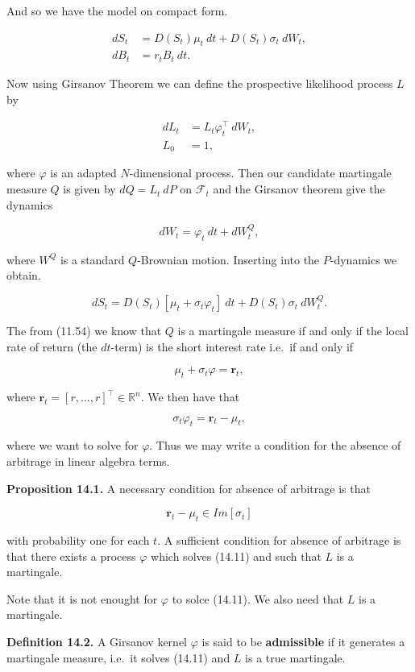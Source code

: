 \documentclass[
]{article}
\begin{document}
And so we have the model on compact form.

\begin{align*}
dS_t&= D(S_t)\mu_t\ dt+D(S_t)\sigma_t\ dW_t,\\
dB_t&=r_tB_t\ dt.
\end{align*}

Now using Girsanov Theorem we can define the prospective likelihood
process \(L\) by

\begin{align*}
dL_t&=L_t\varphi_t^\top\ dW_t,\\
L_0&=1,
\end{align*}

where \(\varphi\) is an adapted \(N\)-dimensional process. Then our
candidate martingale measure \(Q\) is given by \(dQ=L_t\ dP\) on
\(\mathcal{F}_t\) and the Girsanov theorem give the dynamics

\[
dW_t=\varphi_t\ dt+dW_t^Q,
\]

where \(W^Q\) is a standard \(Q\)-Brownian motion. Inserting into the
\(P\)-dynamics we obtain.

\[
dS_t=D(S_t)[\mu_t+\sigma_t\varphi_t]\ dt+D(S_t)\sigma_t\ dW_t^Q.
\]

The from (11.54) we know that \(Q\) is a martingale measure if and only
if the local rate of return (the \(dt\)-term) is the short interest rate
i.e.~if and only if

\[
\mu_t+\sigma_t\varphi=\mathbf{r}_t,
\]

where \(\mathbf{r}_t=[r,...,r]^\top\in\mathbb{R}^n\). We then have that

\[
\sigma_t\varphi_t = \mathbf{r}_t-\mu_t,\tag{14.11}
\]

where we want to solve for \(\varphi\). Thus we may write a condition
for the absence of arbitrage in linear algebra terms.

\textbf{Proposition 14.1.} A necessary condition for absence of
arbitrage is that

\[
\mathbf{r}_t-\mu_t\in Im[\sigma_t]
\]

with probability one for each \(t\). A sufficient condition for absence
of arbitrage is that there exists a process \(\varphi\) which solves
(14.11) and such that \(L\) is a martingale.

Note that it is not enought for \(\varphi\) to solce (14.11). We also
need that \(L\) is a martingale.

\textbf{Definition 14.2.} A Girsanov kernel \(\varphi\) is said to be
\textbf{admissible} if it generates a martingale measure, i.e.~it solves
(14.11) and \(L\) is a true martingale.
\end{document}

